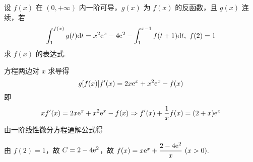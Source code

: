 \begin{example}
    设 $f(x)$ 在 $(0,+\infty)$ 内一阶可导，$g(x)$ 为 $f(x)$ 的反函数，且 $g(x)$ 连续，若
    $$\int_{1}^{f(x)}g(t)\dd t=x^2\mathrm{e} ^x-4\mathrm{e} ^2-\int_{1}^{x-1}f(t+1)\dd t,~f(2)=1$$
    求 $f(x)$ 的表达式.
\end{example}
\begin{solution}
    方程两边对 $x$ 求导得 $$g[f(x)]f'(x)=2x\mathrm{e} ^x+x^2\mathrm{e} ^x-f(x)$$
    即 $$xf'(x)=2x\mathrm{e} ^x+x^2\mathrm{e} ^x-f(x)\Rightarrow f'(x)+\dfrac{1}{x}f(x)=(2+x)\mathrm{e} ^x$$
    由一阶线性微分方程通解公式得
    由 $f(2)=1$，故 $C=2-4\mathrm{e} ^2$，故 $f(x)=x\mathrm{e} ^x+\dfrac{2-4\mathrm{e} ^2}{x}~ (x>0).$
\end{solution}

